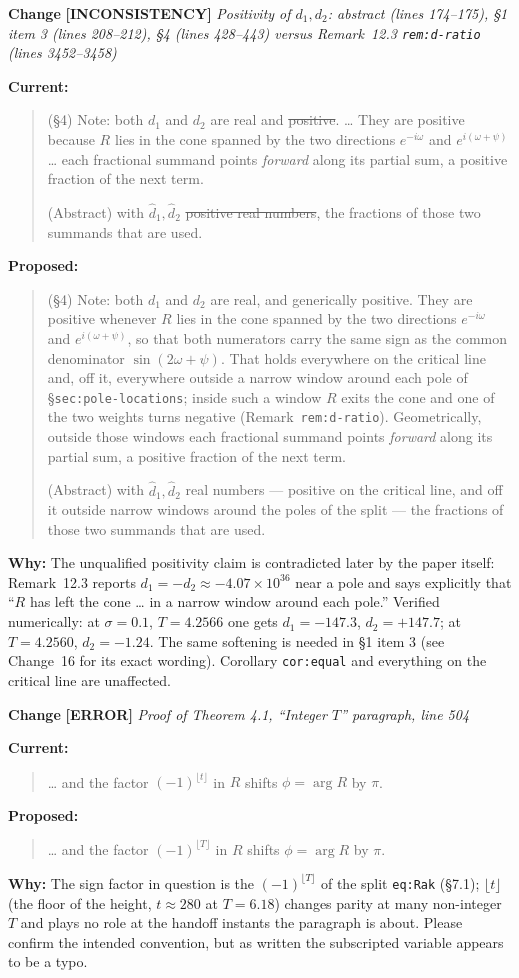 \documentclass[11pt]{article}
\newcounter{chg}
\newcommand{\change}[3]{%
  \refstepcounter{chg}%
  \bigskip\par\noindent
  {\large\textbf{Change \thechg}}\quad
  {\color{#1}\textbf{[#2]}}\quad
  \textit{#3}\par\nobreak\smallskip}
\newenvironment{cur}{\par\noindent\textbf{Current:}\begin{quote}\color{delred}}{\end{quote}}
\newenvironment{prop}{\par\noindent\textbf{Proposed:}\begin{quote}\color{insblue}}{\end{quote}}
\newcommand{\why}[1]{\par\noindent\textbf{Why:} #1\par}
\begin{document}
\change{taginc}{INCONSISTENCY}{Positivity of $d_1,d_2$: abstract (lines
174--175), \S{}1 item 3 (lines 208--212), \S{}4 (lines 428--443) versus
Remark~12.3 \texttt{rem:d-ratio} (lines 3452--3458)}
\begin{cur}
(\S{}4) Note: both $d_1$ and $d_2$ are real and \sout{positive}. \ldots{} They
are positive because $R$ lies in the cone spanned by the two directions
$e^{-i\omega}$ and $e^{i(\omega+\psi)}$ \ldots{} each fractional summand points
\emph{forward} along its partial sum, a positive fraction of the next term.
\par\smallskip
(Abstract) with $\hat d_1,\hat d_2$ \sout{positive real numbers}, the fractions
of those two summands that are used.
\end{cur}
\begin{prop}
(\S{}4) Note: both $d_1$ and $d_2$ are real, and generically positive. They are
positive whenever $R$ lies in the cone spanned by the two directions
$e^{-i\omega}$ and $e^{i(\omega+\psi)}$, so that both numerators carry the same
sign as the common denominator $\sin(2\omega+\psi)$. That holds everywhere on
the critical line and, off it, everywhere outside a narrow window around each
pole of \S\texttt{sec:pole-locations}; inside such a window $R$ exits the cone
and one of the two weights turns negative (Remark~\texttt{rem:d-ratio}).
Geometrically, outside those windows each fractional summand points
\emph{forward} along its partial sum, a positive fraction of the next term.
\par\smallskip
(Abstract) with $\hat d_1,\hat d_2$ real numbers --- positive on the critical
line, and off it outside narrow windows around the poles of the split --- the
fractions of those two summands that are used.
\end{prop}
\why{The unqualified positivity claim is contradicted later by the paper
itself: Remark~12.3 reports $d_1=-d_2\approx-4.07\times10^{36}$ near a pole and
says explicitly that ``$R$ has left the cone \ldots{} in a narrow window around
each pole.'' Verified numerically: at $\sigma=0.1$, $T=4.2566$ one gets
$d_1=-147.3$, $d_2=+147.7$; at $T=4.2560$, $d_2=-1.24$. The same softening is
needed in \S{}1 item 3 (see Change~16 for its exact wording). Corollary
\texttt{cor:equal} and everything on the critical line are unaffected.}

\change{tagerr}{ERROR}{Proof of Theorem 4.1, ``Integer $T$'' paragraph,
line 504}
\begin{cur}
\ldots{} and the factor \sout{$(-1)^{\lfloor t\rfloor}$} in $R$ shifts
$\phi=\arg R$ by $\pi$.
\end{cur}
\begin{prop}
\ldots{} and the factor $(-1)^{\lfloor T\rfloor}$ in $R$ shifts
$\phi=\arg R$ by $\pi$.
\end{prop}
\why{The sign factor in question is the $(-1)^{\lfloor T\rfloor}$ of the split
\texttt{eq:Rak} (\S{}7.1); $\lfloor t\rfloor$ (the floor of the height,
$t\approx280$ at $T=6.18$) changes parity at many non-integer $T$ and plays no
role at the handoff instants the paragraph is about. Please confirm the intended
convention, but as written the subscripted variable appears to be a typo.}
\end{document}
